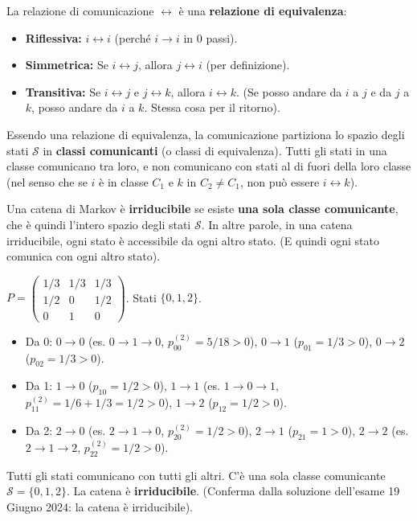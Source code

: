 \begin{proposition}
La relazione di comunicazione $\leftrightarrow$ è una \textbf{relazione di equivalenza}:
\begin{itemize}
    \item \textbf{Riflessiva:} $i \leftrightarrow i$ (perché $i \to i$ in 0 passi).
    \item \textbf{Simmetrica:} Se $i \leftrightarrow j$, allora $j \leftrightarrow i$ (per definizione).
    \item \textbf{Transitiva:} Se $i \leftrightarrow j$ e $j \leftrightarrow k$, allora $i \leftrightarrow k$. (Se posso andare da $i$ a $j$ e da $j$ a $k$, posso andare da $i$ a $k$. Stessa cosa per il ritorno).
\end{itemize}
\end{proposition}
Essendo una relazione di equivalenza, la comunicazione partiziona lo spazio degli stati $\mathcal{S}$ in \textbf{classi comunicanti} (o classi di equivalenza). Tutti gli stati in una classe comunicano tra loro, e non comunicano con stati al di fuori della loro classe (nel senso che se $i$ è in classe $C_1$ e $k$ in $C_2 \neq C_1$, non può essere $i \leftrightarrow k$).

\begin{definition}
Una catena di Markov è \textbf{irriducibile} se esiste \textbf{una sola classe comunicante}, che è quindi l'intero spazio degli stati $\mathcal{S}$.
In altre parole, in una catena irriducibile, ogni stato è accessibile da ogni altro stato. (E quindi ogni stato comunica con ogni altro stato).
\end{definition}

\begin{example}
$P = \begin{pmatrix} 1/3 & 1/3 & 1/3 \\ 1/2 & 0 & 1/2 \\ 0 & 1 & 0 \end{pmatrix}$. Stati $\{0,1,2\}$.
\begin{itemize}
    \item Da 0: $0 \to 0$ (es. $0 \to 1 \to 0$, $p_{00}^{(2)}=5/18>0$), $0 \to 1$ ($p_{01}=1/3>0$), $0 \to 2$ ($p_{02}=1/3>0$).
    \item Da 1: $1 \to 0$ ($p_{10}=1/2>0$), $1 \to 1$ (es. $1 \to 0 \to 1$, $p_{11}^{(2)}=1/6+1/3=1/2>0$), $1 \to 2$ ($p_{12}=1/2>0$).
    \item Da 2: $2 \to 0$ (es. $2 \to 1 \to 0$, $p_{20}^{(2)}=1/2>0$), $2 \to 1$ ($p_{21}=1>0$), $2 \to 2$ (es. $2 \to 1 \to 2$, $p_{22}^{(2)}=1/2>0$).
\end{itemize}
Tutti gli stati comunicano con tutti gli altri. C'è una sola classe comunicante $\mathcal{S}=\{0,1,2\}$.
La catena è \textbf{irriducibile}.
(Conferma dalla soluzione dell'esame 19 Giugno 2024: la catena è irriducibile).
\end{example}

